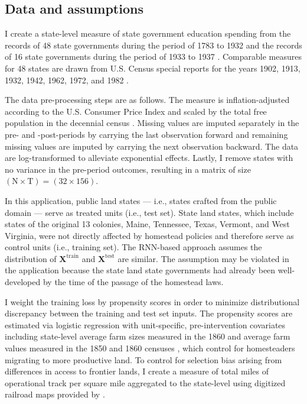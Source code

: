 \documentclass[hidelinks,12pt]{article}
\begin{document}
\subsection{Data and assumptions} \label{educ-data}

I create a state-level measure of state government education spending from the records of 48 state governments during the period of 1783 to 1932 \citep{sylla1993sources} and the records of 16 state governments during the period of 1933 to 1937 \citep{sylla1995sourcesa,sylla1995sourcesb}. Comparable measures for 48 states are drawn from U.S. Census special reports for the years 1902, 1913, 1932, 1942, 1962, 1972, and 1982 \citep{haines2010}.

The data pre-processing steps are as follows. The measure is inflation-adjusted according to the U.S. Consumer Price Index \citep{williamson2017seven} and scaled by the total free population in the decennial census \citep{haines2010}. Missing values are imputed separately in the pre- and -post-periods by carrying the last observation forward and remaining missing values are imputed by carrying the next observation backward. The data are log-transformed to alleviate exponential effects. Lastly, I remove states with no variance in the pre-period outcomes, resulting in a matrix of size $(\text{N} \times \text{T})= (32 \times 156)$. 

In this application, public land states --- i.e., states crafted from the public domain --- serve as treated units (i.e., test set). State land states, which include states of the original 13 colonies, Maine, Tennessee, Texas, Vermont, and West Virginia, were not directly affected by homestead policies and therefore serve as control units (i.e., training set). The RNN-based approach assumes the distribution of $\boldsymbol{X}^{\text{train}}$ and $\boldsymbol{X}^{\text{test}}$ are similar. The assumption may be violated in the application because the state land state governments had already been well-developed by the time of the passage of the homestead laws.

I weight the training loss by  propensity scores in order to minimize distributional discrepancy between the training and test set inputs. The propensity scores are estimated via logistic regression with unit-specific, pre-intervention covariates including state-level average farm sizes measured in the 1860 and average farm values measured in the 1850 and 1860 censuses \citep{haines2010}, which control for homesteaders migrating to more productive land. To control for selection bias arising from differences in access to frontier lands, I create a measure of total miles of operational track per square mile aggregated to the state-level using digitized railroad maps provided by \citet{atack2013use}. 
\end{document}
